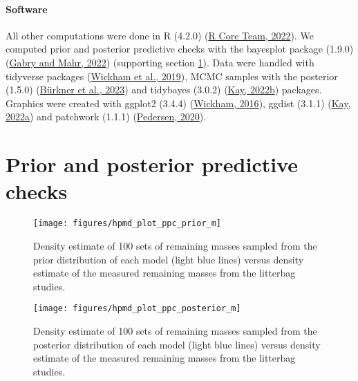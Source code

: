 \documentclass[
  12pt,
]{article}
\begin{document}
\hypertarget{software}{%
\paragraph*{Software}\label{software}}

All other computations were done in R (4.2.0) (\protect\hyperlink{ref-RCoreTeam.2022}{R Core Team, 2022}). We computed prior and posterior predictive checks with the bayesplot package (1.9.0) (\protect\hyperlink{ref-Gabry.2022}{Gabry and Mahr, 2022}) (supporting section \ref{sup-3}). Data were handled with tidyverse packages (\protect\hyperlink{ref-Wickham.2019}{Wickham et al., 2019}), MCMC samples with the posterior (1.5.0) (\protect\hyperlink{ref-Burkner.2023}{Bürkner et al., 2023}) and tidybayes (3.0.2) (\protect\hyperlink{ref-Kay.2022}{Kay, 2022b}) packages. Graphics were created with ggplot2 (3.4.4) (\protect\hyperlink{ref-Wickham.2016}{Wickham, 2016}), ggdist (3.1.1) (\protect\hyperlink{ref-Kay.2022a}{Kay, 2022a}) and patchwork (1.1.1) (\protect\hyperlink{ref-Pedersen.2020}{Pedersen, 2020}).

\hypertarget{sup-3}{%
\section{Prior and posterior predictive checks}\label{sup-3}}



\begin{figure}[H]

{\centering \texttt{[image: figures/hpmd\_plot\_ppc\_prior\_m]} 

}

\caption{Density estimate of 100 sets of remaining masses sampled from the prior distribution of each model (light blue lines) versus density estimate of the measured remaining masses from the litterbag studies.}\label{fig:sup-hpmd-plot-ppc-prior-m}
\end{figure}



\begin{figure}[H]

{\centering \texttt{[image: figures/hpmd\_plot\_ppc\_posterior\_m]} 

}

\caption{Density estimate of 100 sets of remaining masses sampled from the posterior distribution of each model (light blue lines) versus density estimate of the measured remaining masses from the litterbag studies.}\label{fig:sup-hpmd-plot-ppc-posterior-m}
\end{figure}
\end{document}
